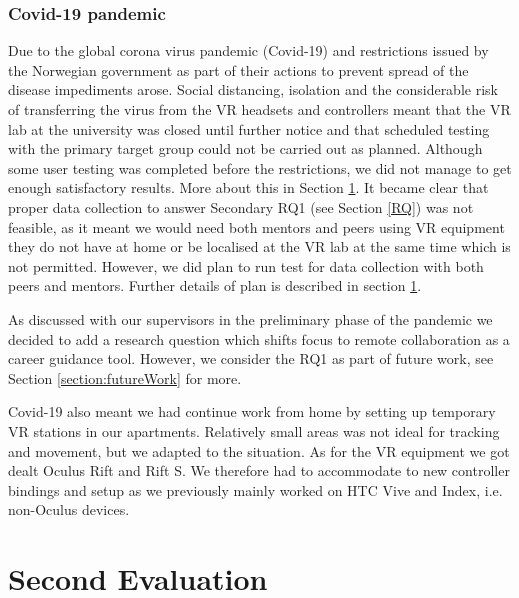 \subsubsection{Covid-19 pandemic}
\label{section:covid19}
Due to the global corona virus pandemic (Covid-19) and restrictions issued by the Norwegian government as part of their actions to prevent spread of the disease \cite{FhiCorona} impediments arose. Social distancing, isolation and the considerable risk of transferring the virus from the VR headsets and controllers meant that the VR lab at the university was closed until further notice and that scheduled testing with the primary target group could not be carried out as planned. Although some user testing was completed before the restrictions, we did not manage to get enough satisfactory results. More about this in Section \ref{section:secondEvalPhase2}. It became clear that proper data collection to answer Secondary RQ1 (see Section \ref{RQ}) was not feasible, as it meant we would need both mentors and peers using VR equipment they do not have at home or be localised at the VR lab at the same time which is not permitted. However, we did plan to run test for data collection with both peers and mentors. Further details of plan is described in section \ref{section:secondEvalPhase2}.

As discussed with our supervisors in the preliminary phase of the pandemic we decided to add a research question which shifts focus to remote collaboration as a career guidance tool. However, we consider the RQ1 as part of future work, see Section \ref{section:futureWork} for more. 

Covid-19 also meant we had continue work from home by setting up temporary VR stations in our apartments. Relatively small areas was not ideal for tracking and movement, but we adapted to the situation. As for the VR equipment we got dealt Oculus Rift and Rift S. We therefore had to accommodate to new controller bindings and setup as we previously mainly worked on HTC Vive and Index, i.e. non-Oculus devices.            





\section{Second Evaluation}
\label{section:secondEvalPhase2}

